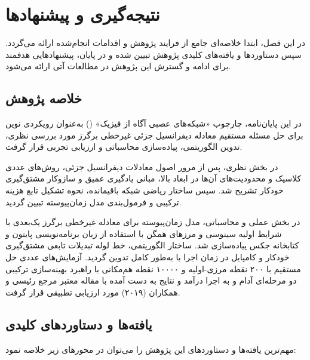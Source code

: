 \chapter{نتیجه‌گیری و پیشنهادها}
\label{ch:conclusion}

در این فصل، ابتدا خلاصه‌ای جامع از فرایند پژوهش و اقدامات انجام‌شده ارائه می‌گردد. سپس دستاوردها و یافته‌های کلیدی پژوهش تبیین شده و در پایان، پیشنهادهایی هدفمند برای ادامه و گسترش این پژوهش در مطالعات آتی ارائه می‌شود.

\section{خلاصه پژوهش}
\label{sec:summary}

در این پایان‌نامه، چارچوب «شبکه‌های عصبی آگاه از فیزیک» () به‌عنوان رویکردی نوین برای حل مسئله مستقیم معادله دیفرانسیل جزئی غیرخطی برگرز مورد بررسی نظری، تدوین الگوریتمی، پیاده‌سازی محاسباتی و ارزیابی تجربی قرار گرفت.

در بخش نظری، پس از مرور اصول معادلات دیفرانسیل جزئی، روش‌های عددی کلاسیک و محدودیت‌های آن‌ها در ابعاد بالا، مبانی یادگیری عمیق و سازوکار مشتق‌گیری خودکار تشریح شد. سپس ساختار ریاضی شبکه باقیمانده، نحوه تشکیل تابع هزینه ترکیبی و فرمول‌بندی مدل زمان‌پیوسته تبیین گردید.

در بخش عملی و محاسباتی، مدل زمان‌پیوسته برای معادله غیرخطی برگرز یک‌بعدی با شرایط اولیه سینوسی و مرزهای همگن با استفاده از زبان برنامه‌نویسی پایتون و کتابخانه جکس پیاده‌سازی شد. ساختار الگوریتمی، خط لوله تبدیلات تابعی مشتق‌گیری خودکار و کامپایل در زمان اجرا با  به‌طور کامل تدوین گردید. آزمایش‌های عددی حل مستقیم با ۲۰۰ نقطه مرزی-اولیه و ۱۰۰۰۰ نقطه هم‌مکانی با راهبرد بهینه‌سازی ترکیبی دو مرحله‌ای آدام و  به اجرا درآمد و نتایج به دست آمده با مقاله معتبر مرجع رئیسی و همکاران (۲۰۱۹) مورد ارزیابی تطبیقی قرار گرفت.

\section{یافته‌ها و دستاوردهای کلیدی}
\label{sec:findings}

مهم‌ترین یافته‌ها و دستاوردهای این پژوهش را می‌توان در محورهای زیر خلاصه نمود:

